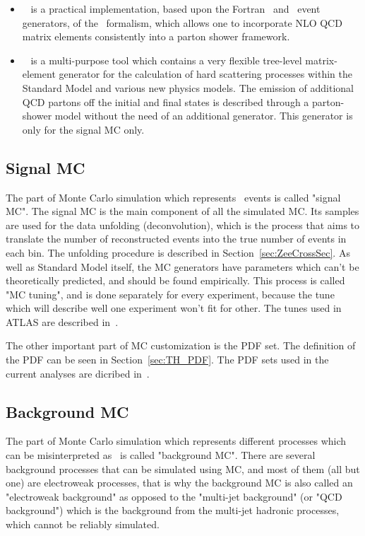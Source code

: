 \begin{itemize}
\item \Mcatnlo~\cite{lib:MC_mcatnlo} is a practical implementation, based upon the Fortran \Herwig\ and \Herwigpp\ event generators, of the \Mcatnlo\ formalism, which allows one to incorporate NLO QCD matrix elements consistently into a parton shower framework.

\item \Sherpa~\cite{lib:MC_sherpa1, lib:MC_sherpa2} is a multi-purpose tool which contains a very flexible tree-level matrix-element generator for the calculation of hard scattering processes within the Standard Model and various new physics models.  The emission of additional QCD partons off  the  initial  and  final  states  is  described through a parton-shower model without the need of an additional generator. This generator is only for the signal MC only.
\end{itemize}

\subsection{Signal MC}

The part of Monte Carlo simulation which represents \Zee\ events is called "signal MC". The signal MC is the main component of all the simulated MC. Its samples are used for the data unfolding (deconvolution), which is the process that aims to translate the number of reconstructed events into the true number of events in each bin. The unfolding procedure is described in Section~\ref{sec:ZeeCrossSec}. As well as Standard Model itself, the MC generators have parameters which can't be theoretically predicted, and should be found empirically. This process is called "MC tuning", and is done separately for every experiment, because the tune which will describe well one experiment won't fit for other. The tunes used in ATLAS are described in~\cite{lib:MC_tune1, lib:MC_tune2}.

The other important part of MC customization is the PDF set. The definition of the PDF can be seen in Section~\ref{sec:TH_PDF}. The PDF sets used in the current analyses are dicribed in~\cite{lib:MC_pdfct10, lib:MC_pdfcteq6l1}.

\subsection{Background MC}

The part of Monte Carlo simulation which represents different processes which can be misinterpreted as \Zee\ is called "background MC". There are several background processes that can be simulated using MC, and most of them (all but one) are electroweak processes, that is why the background MC is also called an "electroweak background" as opposed to the "multi-jet background" (or "QCD background") which is the background from the multi-jet hadronic processes, which cannot be reliably simulated.

